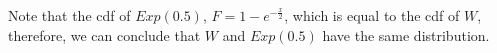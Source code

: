 \documentclass[12pt,letterpaper]{article}
\begin{document}
\noindent Note that the cdf of $Exp(0.5)$, $F = 1 - e^{- \frac{x}{2}}$, which is equal to the cdf of $W$, therefore, we can conclude that $W$ and $Exp(0.5)$ have the same distribution. 

\





\end{document}
